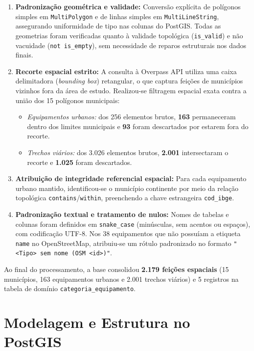 \documentclass[
    12pt,
    oneside,
    a4paper,
    chapter=TITLE,
    section=TITLE,
    brazil
]{abntex2}
\begin{document}
\begin{enumerate}
    \item \textbf{Padronização geométrica e validade:} Conversão explícita de polígonos simples em \texttt{MultiPolygon} e de linhas simples em \texttt{MultiLineString}, assegurando uniformidade de tipo nas colunas do PostGIS. Todas as geometrias foram verificadas quanto à validade topológica (\texttt{is\_valid}) e não vacuidade (\texttt{not is\_empty}), sem necessidade de reparos estruturais nos dados finais.
    \item \textbf{Recorte espacial estrito:} A consulta à Overpass API utiliza uma caixa delimitadora (\emph{bounding box}) retangular, o que captura feições de municípios vizinhos fora da área de estudo. Realizou-se filtragem espacial exata contra a união dos 15 polígonos municipais:
    \begin{itemize}
        \item \emph{Equipamentos urbanos:} dos 256 elementos brutos, \textbf{163} permaneceram dentro dos limites municipais e \textbf{93} foram descartados por estarem fora do recorte.
        \item \emph{Trechos viários:} dos 3.026 elementos brutos, \textbf{2.001} intersectaram o recorte e \textbf{1.025} foram descartados.
    \end{itemize}
    \item \textbf{Atribuição de integridade referencial espacial:} Para cada equipamento urbano mantido, identificou-se o município continente por meio da relação topológica \texttt{contains}/\texttt{within}, preenchendo a chave estrangeira \texttt{cod\_ibge}.
    \item \textbf{Padronização textual e tratamento de nulos:} Nomes de tabelas e colunas foram definidos em \texttt{snake\_case} (minúsculas, sem acentos ou espaços), com codificação UTF-8. Nos 38 equipamentos que não possuíam a etiqueta \texttt{name} no OpenStreetMap, atribuiu-se um rótulo padronizado no formato \texttt{"<Tipo> sem nome (OSM <id>)"}.
\end{enumerate}

Ao final do processamento, a base consolidou \textbf{2.179 feições espaciais} (15 municípios, 163 equipamentos urbanos e 2.001 trechos viários) e 5 registros na tabela de domínio \texttt{categoria\_equipamento}.

\chapter{Modelagem e Estrutura no PostGIS}
\end{document}
